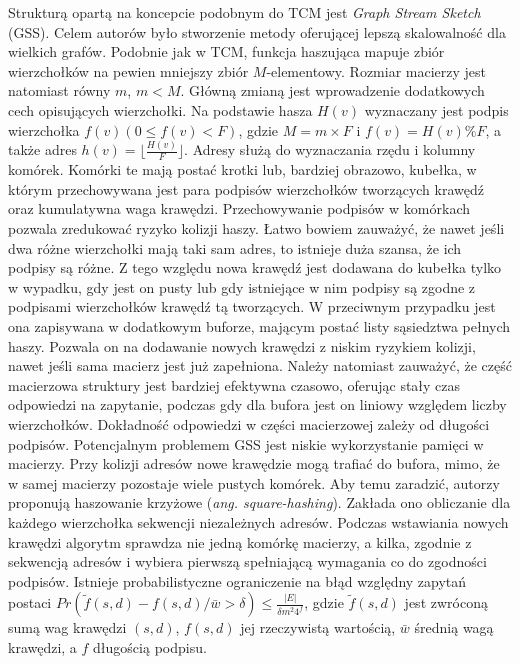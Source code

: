     Strukturą opartą na koncepcie podobnym do TCM jest \emph{Graph Stream Sketch} (GSS)\cite{Gou_Zou_Zhao_Yang_2019}. Celem autorów było stworzenie metody oferującej lepszą skalowalność dla wielkich grafów. Podobnie jak w TCM, funkcja haszująca mapuje zbiór wierzchołków na pewien mniejszy zbiór $M$-elementowy. Rozmiar macierzy jest natomiast równy $m$, $m < M$. Główną zmianą jest wprowadzenie dodatkowych cech opisujących wierzchołki. Na podstawie hasza $H(v)$ wyznaczany jest  podpis wierzchołka $f(v) (0 \leq f(v) < F)$, gdzie $M = m \times F$ i $f(v) = H(v)\%F$, a także adres $h(v) = \lfloor \frac{H(v)}{F} \rfloor$. Adresy służą do wyznaczania rzędu i kolumny komórek. Komórki te mają postać krotki lub, bardziej obrazowo, kubełka, w którym przechowywana jest para podpisów wierzchołków tworzących krawędź oraz kumulatywna waga krawędzi. Przechowywanie podpisów w komórkach pozwala zredukować ryzyko kolizji haszy. Łatwo bowiem zauważyć, że nawet jeśli dwa różne wierzchołki mają taki sam adres, to istnieje duża szansa, że ich podpisy są różne. Z tego względu nowa krawędź jest dodawana do kubełka tylko w wypadku, gdy jest on pusty lub gdy istniejące w nim podpisy są zgodne z podpisami wierzchołków krawędź tą tworzących. W przeciwnym przypadku jest ona zapisywana w dodatkowym buforze, mającym postać listy sąsiedztwa pełnych haszy. Pozwala on na dodawanie nowych krawędzi z niskim ryzykiem kolizji, nawet jeśli sama macierz jest już zapełniona. Należy natomiast zauważyć, że część macierzowa struktury jest bardziej efektywna czasowo, oferując stały czas odpowiedzi na zapytanie, podczas gdy dla bufora jest on liniowy względem liczby wierzchołków. Dokładność odpowiedzi w części macierzowej zależy od długości podpisów. Potencjalnym problemem GSS jest niskie wykorzystanie pamięci w macierzy. Przy kolizji adresów nowe krawędzie mogą trafiać do bufora, mimo, że w samej macierzy pozostaje wiele pustych komórek. Aby temu zaradzić, autorzy proponują haszowanie krzyżowe (\emph{ang. square-hashing}). Zakłada ono obliczanie dla każdego wierzchołka sekwencji niezależnych adresów. Podczas wstawiania nowych krawędzi algorytm sprawdza nie jedną komórkę macierzy, a kilka, zgodnie z sekwencją adresów i wybiera pierwszą spełniającą wymagania co do zgodności podpisów. Istnieje probabilistyczne ograniczenie na błąd względny zapytań postaci $Pr(\tilde{f}(s,d) - f(s,d) / \bar{w} > \delta) \leq \frac{|E|}{\delta m^2 4^{f}}$, gdzie $\tilde{f}(s,d)$ jest zwróconą sumą wag krawędzi $(s,d)$, $f(s,d)$ jej rzeczywistą wartością, $\bar{w}$ średnią wagą krawędzi, a $f$ długością podpisu.

